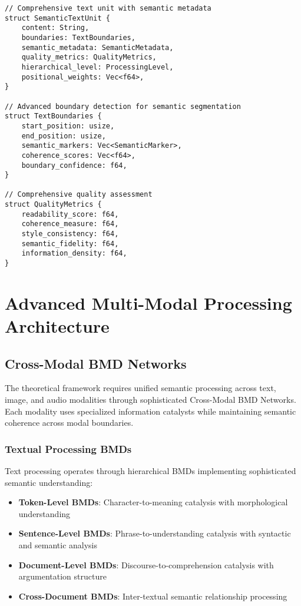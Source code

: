 \documentclass[12pt,a4paper,twoside]{article}
\begin{document}
\begin{lstlisting}[caption=Hierarchical Text Processing Structure]
// Comprehensive text unit with semantic metadata
struct SemanticTextUnit {
    content: String,
    boundaries: TextBoundaries,
    semantic_metadata: SemanticMetadata,
    quality_metrics: QualityMetrics,
    hierarchical_level: ProcessingLevel,
    positional_weights: Vec<f64>,
}

// Advanced boundary detection for semantic segmentation
struct TextBoundaries {
    start_position: usize,
    end_position: usize,
    semantic_markers: Vec<SemanticMarker>,
    coherence_scores: Vec<f64>,
    boundary_confidence: f64,
}

// Comprehensive quality assessment
struct QualityMetrics {
    readability_score: f64,
    coherence_measure: f64,
    style_consistency: f64,
    semantic_fidelity: f64,
    information_density: f64,
}
\end{lstlisting}

\section{Advanced Multi-Modal Processing Architecture}

\subsection{Cross-Modal BMD Networks}

The theoretical framework requires unified semantic processing across text, image, and audio modalities through sophisticated Cross-Modal BMD Networks. Each modality uses specialized information catalysts while maintaining semantic coherence across modal boundaries.

\subsubsection{Textual Processing BMDs}

Text processing operates through hierarchical BMDs implementing sophisticated semantic understanding:

\begin{itemize}
\item \textbf{Token-Level BMDs}: Character-to-meaning catalysis with morphological understanding
\item \textbf{Sentence-Level BMDs}: Phrase-to-understanding catalysis with syntactic and semantic analysis
\item \textbf{Document-Level BMDs}: Discourse-to-comprehension catalysis with argumentation structure
\item \textbf{Cross-Document BMDs}: Inter-textual semantic relationship processing
\end{itemize}
\end{document}
